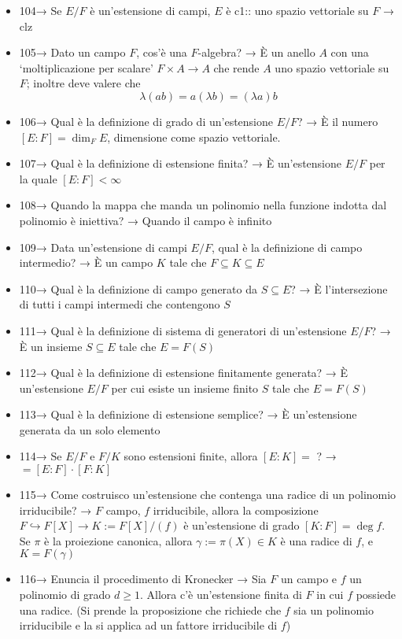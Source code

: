 \documentclass[A4,12pt]{article}
\renewcommand{\subset}{\subseteq}
\begin{document}
\begin{itemize}[noitemsep]
		\item 104→ Se $ E/F $ è un'estensione di campi, $ E $ è {{c1:: uno spazio vettoriale su }} $ F $ → clz
		\item 105→ Dato un campo $ F $, cos'è una $ F $-algebra? → È un anello $ A $ con una \enquote*{moltiplicazione per scalare} $ F\times A\to A $ che rende $ A $ uno spazio vettoriale su $ F $; inoltre deve valere che \[\lambda(ab)=a(\lambda b) = (\lambda a)b\]
		\item 106→ Qual è la definizione di grado di un'estensione $ E/F $? → È il numero $ [E:F] = \dim_F E$, dimensione come spazio vettoriale.
		\item 107→ Qual è la definizione di estensione finita? → È un'estensione $ E/F $ per la quale $ [E:F]<\infty$
		\item 108→ Quando la mappa che manda un polinomio nella funzione indotta dal polinomio è iniettiva? → Quando il campo è infinito
		\item 109→ Data un'estensione di campi $ E/F $, qual è la definizione di campo intermedio? → È un campo $ K $ tale che $ F\subset K\subset E $
		\item 110→ Qual è la definizione di campo generato da $ S\subset E $? → È l'intersezione di tutti i campi intermedi che contengono $ S $
		\item 111→ Qual è la definizione di sistema di generatori di un'estensione $ E/F $? →  È un insieme $ S\subset E $ tale che $ E = F(S)$
		\item 112→ Qual è la definizione di estensione finitamente generata? → È un'estensione $ E/F $ per cui esiste un insieme finito $ S $ tale che $ E=F(S) $
		\item 113→ Qual è la definizione di estensione semplice? → È un'estensione generata da un solo elemento
		\item 114→ Se $ E/F $ e $ F/K $ sono estensioni finite, allora $ [E:K] =  $ ? → $ = [E:F]\cdot [F:K] $
		\item 115→ Come costruisco un'estensione che contenga una radice di un polinomio irriducibile? → $ F $ campo, $ f $ irriducibile, allora la composizione $ F\hookrightarrow F[X] \to K:=F[X]/(f)$ è un'estensione di grado $ [K:F] = \deg f $. Se $ \pi $ è la proiezione canonica, allora $ \gamma:= \pi(X)\in K $ è una radice di $ f $, e $ K=F(\gamma) $
		\item 116→ Enuncia il procedimento di Kronecker → Sia $ F $ un campo e $ f $ un polinomio di grado $ d\geq 1 $. Allora c'è un'estensione finita di $ F $ in cui $ f $ possiede una radice. (Si prende la proposizione che richiede che $ f $ sia un polinomio irriducibile e la si applica ad un fattore irriducibile di $ f $) 

\end{itemize}
\end{document}
